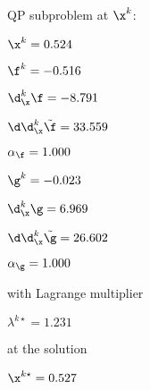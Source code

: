 QP subproblem at $\x^{k}$:

\bigskip
$\x^k=   0.524$


$\f^k =  -0.516$

$\d^k_{\x} \f =  -8.791$

$\d\d^k_{\x} \tilde \f =  33.559$

$\alpha_{\footnotesize\f} =   1.000$

\bigskip
$\g^k =  -0.023$

$\d^k_{\x}\g =   6.969$

$\d\d^k_{\x} \tilde \g =  26.602$

$\alpha_{\footnotesize\g} =   1.000$

\bigskip
with Lagrange multiplier

$\lambda^{k\star} =   1.231$

at the solution

$\x^{k\star} =   0.527$

